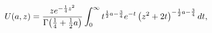 \[\mathop{U\/}\nolimits\!\left(a,z\right)=\frac{ze^{-\frac{1}{4}z^{2}}}{\mathop{%
\Gamma\/}\nolimits\!\left(\frac{1}{4}+\frac{1}{2}a\right)}\*\int_{0}^{\infty}t%
^{\frac{1}{2}a-\frac{3}{4}}e^{-t}\left(z^{2}+2t\right)^{-\frac{1}{2}a-\frac{3}%
{4}}dt,\]